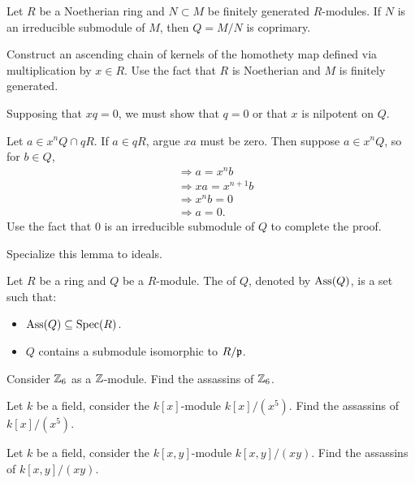 \documentclass{ximera}
\begin{document}
\begin{lemma}
  Let $R$ be a Noetherian ring and $N\subset M$ be finitely generated
  $R$-modules. If $N$ is an irreducible submodule of $M$, then $Q=M/N$
  is coprimary.
  \begin{sketch}
    Construct an ascending chain of kernels of the homothety map
    defined via multiplication by $x\in R$. Use the fact that $R$ is
    Noetherian and $M$ is finitely generated.
    
    Supposing that $x q= 0$, we must show that $q= 0$ or that $x$ is
    nilpotent on $Q$.

    Let $a \in x^n Q \cap qR$. If $a\in qR$, argue $xa$ must be zero.
    Then suppose $a\in x^n Q$, so for $b\in Q$,
    \begin{align*}
      &\Rightarrow a = x^nb\\
      &\Rightarrow xa = x^{n+1}b\\
      &\Rightarrow x^n b = 0\\
      &\Rightarrow a=0.
    \end{align*}
    Use the fact that $0$ is an irreducible submodule of $Q$ to
    complete the proof.
  \end{sketch}
\end{lemma}


\begin{exercise}
  Specialize this lemma to ideals.
\end{exercise}



\begin{definition}
  Let $R$ be a ring and $Q$ be a $R$-module. The  of
  $Q$, denoted by $\operatorname{Ass}(Q)$, is a set such that:
  \begin{itemize}
  \item $\operatorname{Ass}(Q)\subseteq\operatorname{Spec}(R)$.
  \item $Q$ contains a submodule isomorphic to $R/\mathfrak{p}$.
  \end{itemize}
\end{definition}

\begin{exercise}
  Consider $\mathbb Z_6$ as a $\mathbb Z$-module. Find the assassins of $\mathbb Z_6$.
\end{exercise}

\begin{exercise}
  Let $k$ be a field, consider the $k[x]$-module $k[x]/(x^5)$. Find
  the assassins of $k[x]/(x^5)$.
\end{exercise}

\begin{exercise}
  Let $k$ be a field, consider the $k[x,y]$-module $k[x,y]/(xy)$. Find
  the assassins of $k[x,y]/(xy)$.
\end{exercise}
\end{document}

